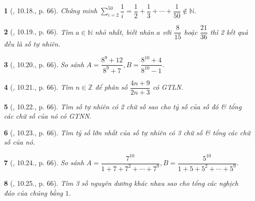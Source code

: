 \documentclass{article}
\newtheorem{baitoan}{}
\begin{document}
\begin{baitoan}[\cite{TLCT_THCS_Toan_6_so_hoc}, 10.18., p. 66]
	Chứng minh $\sum_{i=2}^{50} \dfrac{1}{i} = \dfrac{1}{2} + \dfrac{1}{3} + \cdots + \dfrac{1}{50}\notin\mathbb{N}$.
\end{baitoan}

\begin{baitoan}[\cite{TLCT_THCS_Toan_6_so_hoc}, 10.19., p. 66]
	Tìm $a\in\mathbb{N}$ nhỏ nhất, biết nhân $a$ với $\dfrac{8}{15}$ hoặc $\dfrac{21}{36}$ thì 2 kết quả đều là số tự nhiên.
\end{baitoan}

\begin{baitoan}[\cite{TLCT_THCS_Toan_6_so_hoc}, 10.20., p. 66]
	So sánh $A = \dfrac{8^9 + 12}{8^9 + 7},B = \dfrac{8^{10} + 4}{8^{10} - 1}$.
\end{baitoan}

\begin{baitoan}[\cite{TLCT_THCS_Toan_6_so_hoc}, 10.21., p. 66]
	Tìm $n\in\mathbb{Z}$ để phân số $\dfrac{4n + 9}{2n + 3}$ có {\rm GTLN}.
\end{baitoan}

\begin{baitoan}[\cite{TLCT_THCS_Toan_6_so_hoc}, 10.22., p. 66]
	Tìm số tự nhiên có 2 chữ số sao cho tỷ số của số đó \& tổng các chữ số của nó có {\rm GTNN}.
\end{baitoan}

\begin{baitoan}[\cite{TLCT_THCS_Toan_6_so_hoc}, 10.23., p. 66]
	Tìm tỷ số lớn nhất của số tự nhiên có 3 chữ số \& tổng các chữ số của nó.
\end{baitoan}

\begin{baitoan}[\cite{TLCT_THCS_Toan_6_so_hoc}, 10.24., p. 66]
	So sánh $A = \dfrac{7^{10}}{1 + 7 + 7^2 + \cdots + 7^9},B = \dfrac{5^{10}}{1 + 5 + 5^2 + \cdots + 5^9}$.
\end{baitoan}

\begin{baitoan}[\cite{TLCT_THCS_Toan_6_so_hoc}, 10.25., p. 66]
	Tìm 3 số nguyên dương khác nhau sao cho tổng các nghịch đảo của chúng bằng $1$.
\end{baitoan}

\end{document}

